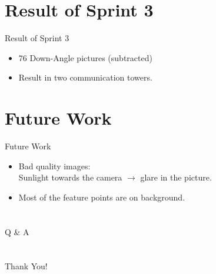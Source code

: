 \documentclass[slidestop,compress,mathserif,c]{beamer}
\begin{document}
    \section{Result of Sprint 3}
    \begin{frame}{Result of Sprint 3}
        \begin{itemize}
            \item 76 Down-Angle pictures (subtracted)
            \item Result in two communication towers.
        \end{itemize}
    \end{frame}
    
    \section{Future Work}
    \begin{frame}{Future Work}
        \begin{itemize}
            \item Bad quality images:\\
            Sunlight towards the camera $\rightarrow$ glare in the picture.
            \item Most of the feature points are on background.
        \end{itemize}
    \end{frame}
    
    \section*{}
		\begin{frame}
			\begin{center}
				\Huge{Q \& A}
			\end{center}
		\end{frame}
    
    \section*{}
		\begin{frame}
			\begin{center}
				\Huge{Thank You!}
			\end{center}
		\end{frame}
\end{document}
